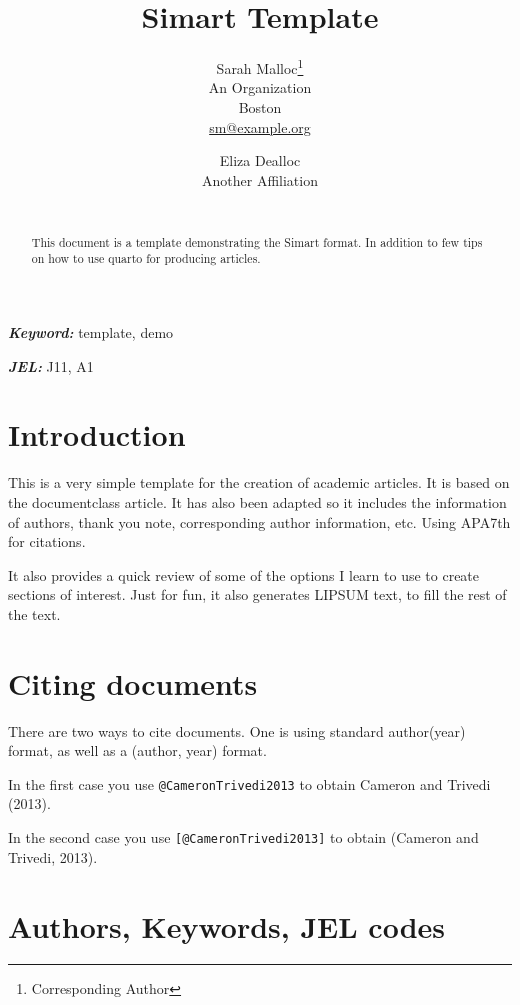 \documentclass[
  11pts,
]{article}
\title{Simart Template}
\author{
Sarah Malloc\footnote{Corresponding Author}\\
An Organization\\
Boston\\
\href{mailto:sm@example.org}{sm@example.org}\and 
Eliza Dealloc\\
Another Affiliation\\
\\
}
\date{}
\begin{document}
\def\spacingset#1{\renewcommand{\baselinestretch}%
{#1}\small\normalsize} \spacingset{1}


\maketitle
\begin{abstract}
This document is a template demonstrating the Simart format. In addition
to few tips on how to use quarto for producing articles.
\end{abstract}
 
\vspace{.2in}

\textbf{\textit{Keyword: }}
    template, 
    demo 

\textbf{\textit{JEL: }}
    J11, 
    A1 

\thispagestyle{empty}
\clearpage{}
\newpage
\spacingset{1.2} %
\section{Introduction}\label{sec-intro}

This is a very simple template for the creation of academic articles. It
is based on the documentclass article. It has also been adapted so it
includes the information of authors, thank you note, corresponding
author information, etc. Using APA7th for citations.

It also provides a quick review of some of the options I learn to use to
create sections of interest. Just for fun, it also generates LIPSUM
text, to fill the rest of the text.

\section{Citing documents}\label{sec-cite}

There are two ways to cite documents. One is using standard author(year)
format, as well as a (author, year) format.

In the first case you use \texttt{@CameronTrivedi2013} to obtain Cameron
and Trivedi (2013).

In the second case you use \texttt{{[}@CameronTrivedi2013{]}} to obtain
(Cameron and Trivedi, 2013).

\section{Authors, Keywords, JEL codes}\label{authors-keywords-jel-codes}
\end{document}
